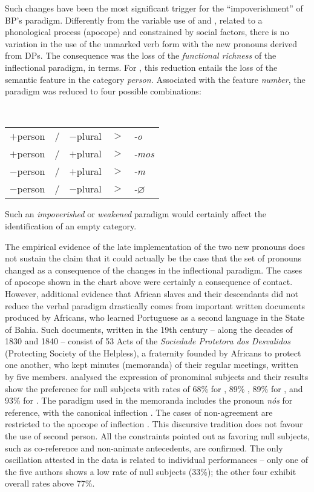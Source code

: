 \documentclass[output=paper]{langsci/langscibook}
\begin{document}
Such changes have been the most significant trigger for the “impoverishment” of
BP’s paradigm. Differently from the variable use of  and , related to a
phonological process (apocope) and constrained by social factors, there is no
variation in the use of the unmarked verb form with the new pronouns derived
from DPs. The consequence was the loss of the \emph{functional richness}
of the inflectional paradigm, in  terms. For
\citet{Galves1993}, this reduction entails the loss of the semantic feature in
the category \emph{person.} Associated with the feature \emph{number}, the
paradigm was reduced to four possible combinations:

\ea%
    \label{ex:26.5}\leavevmode\\[-1\baselineskip]%
    \begin{tabular}{lllll}
    $+$person & / & $-$plural & $>$ & \emph{-o} \\
    $+$person & / & $+$plural & $>$ & \emph{-mos} \\
    $-$person & / & $+$plural & $>$ & \emph{-m} \\
    $-$person & / & $-$plural & $>$ & \emph{-}$\varnothing$ \\
    \end{tabular}
\z

Such an \emph{impoverished} or \emph{weakened} paradigm would certainly affect
the identification of an empty category.

The empirical evidence of the late implementation of the two new pronouns does
not sustain the claim that it could actually be the case that the set of
pronouns changed as a consequence of the changes in the inflectional paradigm.
The cases of apocope shown in the chart above were certainly a consequence of
contact. However, additional evidence that African slaves and their descendants
did not reduce the verbal paradigm drastically comes from important written
documents produced by Africans, who learned Portuguese as a second language in
the State of Bahia. Such documents, written in the 19th
century – along the decades of 1830 and 1840 – consist of 53 Acts of the
\emph{Sociedade Protetora dos Desvalidos} (Protecting
Society of the Helpless), a fraternity founded by Africans to protect one
another, who kept minutes (memoranda) of their regular meetings, written by
five members. \citet{AlmeidaCarneiro2009} analysed the expression of pronominal
subjects and their results show the preference for null subjects with rates of
68\% for \Fsg{}, 89\% \Fpl{}, 89\% for \Tsg{}, and 93\% for \Tpl{}. The
paradigm used in the memoranda includes the pronoun \emph{nós} for \Fpl{}
reference, with the canonical inflection . The cases of non-agreement are
restricted to the apocope of \Tpl{} inflection . This discursive tradition
does not favour the use of second person. All the constraints pointed out as
favoring null subjects, such as co-reference and non-animate antecedents, are
confirmed. The only oscillation attested in the data is related to individual
performances – only one of the five authors shows a low rate of null subjects
(33\%); the other four exhibit overall rates above 77\%.
\end{document}
